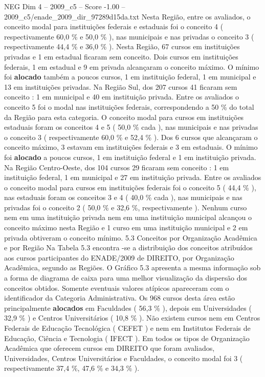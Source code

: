 \begin{textsample}{NEG Dim 4 – 2009\_c5 – Score -1.00 – 2009\_c5/enade\_2009\_dir\_97289d15da.txt}
Nesta Região, entre os avaliados, o conceito modal para instituições federais e estaduais foi o conceito 4 ( respectivamente 60,0 \% e 50,0 \% ), nas municipais e nas privadas o conceito 3 ( respectivamente 44,4 \% e 36,0 \% ).
Nesta Região, 67 cursos em instituições privadas e 1 em estadual ficaram sem conceito.
Dois cursos em instituições federais, 1 em estadual e 9 em privada alcançaram o conceito máximo.
O mínimo foi \textbf{alocado} também a poucos cursos, 1 em instituição federal, 1 em municipal e 13 em instituições privadas.
Na Região Sul, dos 207 cursos 41 ficaram sem conceito : 1 em municipal e 40 em instituição privada.
Entre os avaliados o conceito 5 foi o modal nas instituições federais, correspondendo a 50 \% do total da Região para esta categoria.
O conceito modal para cursos em instituições estaduais foram os conceitos 4 e 5 ( 50,0 \% cada ), nas municipais e nas privadas o conceito 3 ( respectivamente 60,0 \% e 52,4 \% ).
Dos 6 cursos que alcançaram o conceito máximo, 3 estavam em instituições federais e 3 em estaduais.
O mínimo foi \textbf{alocado} a poucos cursos, 1 em instituição federal e 1 em instituição privada.
Na Região Centro-Oeste, dos 104 cursos 29 ficaram sem conceito : 1 em instituição federal, 1 em municipal e 27 em instituição privada.
Entre os avaliados o conceito modal para cursos em instituições federais foi o conceito 5 ( 44,4 \% ), nas estaduais foram os conceitos 3 e 4 ( 40,0 \% cada ), nas municipais e nas privadas foi o conceito 2 ( 50,0 \% e 32,6 \%, respectivamente ).
Nenhum curso nem em uma instituição privada nem em uma instituição municipal alcançou o conceito máximo nesta Região e 1 curso em uma instituição municipal e 2 em privada obtiveram o conceito mínimo. 5.3 Conceitos por Organização Acadêmica e por Região Na Tabela 5.3 encontra -se a distribuição dos conceitos atribuídos aos cursos participantes do ENADE/2009 de DIREITO, por Organização Acadêmica, segundo as Regiões.
O Gráfico 5.3 apresenta a mesma informação sob a forma de diagrama de caixa para uma melhor visualização da dispersão dos conceitos obtidos.
Somente eventuais valores atípicos apareceram com o identificador da Categoria Administrativa.
Os 968 cursos desta área estão principalmente \textbf{alocados} em Faculdades ( 56,3 \% ), depois em Universidades ( 32,9 \% ) e Centros Universitários ( 10,8 \% ).
Não existem cursos nem em Centros Federais de Educação Tecnológica ( CEFET ) e nem em Institutos Federais de Educação, Ciência e Tecnologia ( IFECT ).
Em todos os tipos de Organização Acadêmica que oferecem cursos em DIREITO que foram avaliados, Universidades, Centros Universitários e Faculdades, o conceito modal foi 3 ( respectivamente 37,4 \%, 47,6 \% e 34,3 \% ).

\end{textsample}
